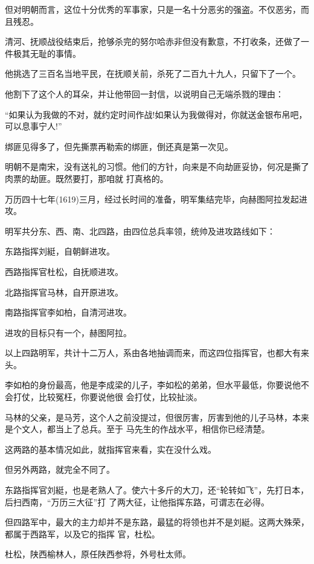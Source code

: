 \documentclass[11pt,a4paper,onecolumn]{article}
\begin{document}
但对明朝而言，这位十分优秀的军事家，只是一名十分恶劣的强盗。不仅恶劣，而且残忍。

清河、抚顺战役结束后，抢够杀完的努尔哈赤非但没有歉意，不打收条，还做了一件极其无耻的事情。

他挑选了三百名当地平民，在抚顺关前，杀死了二百九十九人，只留下了一个。

他割下了这个人的耳朵，并让他带回一封信，以说明自己无端杀戮的理由：

``如果认为我做的不对，就约定时间作战!如果认为我做得对，你就送金银布帛吧，可以息事宁人!''

绑匪见得多了，但先撕票再勒索的绑匪，倒还真是第一次见。

明朝不是南宋，没有送礼的习惯。他们的方针，向来是不向劫匪妥协，何况是撕了肉票的劫匪。既然要打，那咱就
打真格的。

万历四十七年(1619)三月，经过长时间的准备，明军集结完毕，向赫图阿拉发起进攻。

明军共分东、西、南、北四路，由四位总兵率领，统帅及进攻路线如下：

东路指挥刘綎，自朝鲜进攻。

西路指挥官杜松，自抚顺进攻。

北路指挥官马林，自开原进攻。

南路指挥官李如柏，自清河进攻。

进攻的目标只有一个，赫图阿拉。

以上四路明军，共计十二万人，系由各地抽调而来，而这四位指挥官，也都大有来头。

李如柏的身份最高，他是李成梁的儿子，李如松的弟弟，但水平最低，你要说他不会打仗，比较冤枉，你要说他很
会打仗，比较扯淡。

马林的父亲，是马芳，这个人之前没提过，但很厉害，厉害到他的儿子马林，本来是个文人，都当上了总兵。至于
马先生的作战水平，相信你已经清楚。

这两路的基本情况如此，就指挥官来看，实在没什么戏。

但另外两路，就完全不同了。

东路指挥官刘綎，也是老熟人了。使六十多斤的大刀，还``轮转如飞''，先打日本，后扫西南，``万历三大征''打
了两大征，让他指挥东路，可谓志在必得。

但四路军中，最大的主力却并不是东路，最猛的将领也并不是刘綎。这两大殊荣，都属于西路军，以及它的指挥
官，杜松。

杜松，陕西榆林人，原任陕西参将，外号杜太师。

\section[\thesection]{}
\end{document}
